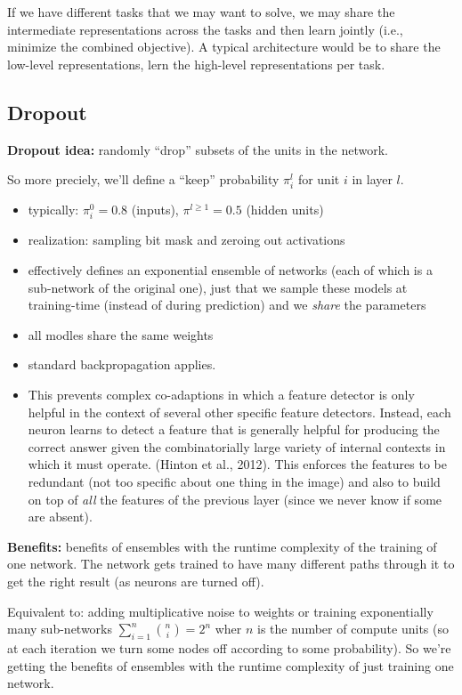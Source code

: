 \documentclass[a2paper,8pt]{extarticle}
\begin{document}
\begin{landscape}
\begin{multicols*}{7}
If we have different tasks that we may want to solve, we may share the
intermediate representations across the tasks and then learn jointly (i.e.,
minimize the combined objective). A typical architecture would be to share the
low-level representations, lern the high-level representations per task.

\subsection{Dropout}

\textbf{Dropout idea:} randomly ``drop'' subsets of the units in the network.

So more preciely, we'll define a ``keep'' probability $\pi_i^l$ for unit $i$ in
layer $l$.
\begin{itemize}
  \item typically: $\pi_i^0=0.8$ (inputs), $\pi^{l\geq 1}=0.5$ (hidden units)
  \item realization: sampling bit mask and zeroing out activations
  \item effectively defines an exponential ensemble of networks (each of which
  is a sub-network of the original one), just that we sample these models at
  training-time (instead of during prediction) and we \emph{share} the
  parameters
  \item all modles share the same weights
  \item standard backpropagation applies.
  \item This prevents complex co-adaptions in which a feature detector is only
helpful in the context of several other specific feature detectors. Instead,
each neuron learns to detect a feature that is generally helpful for producing
the correct answer given the combinatorially large variety of internal contexts
in which it must operate. (Hinton et al., 2012). This enforces the features to be redundant (not too specific about one thing in
the image) and also to build on top of \emph{all} the features of the previous
layer (since we never know if some are absent).
\end{itemize}

\textbf{Benefits:} benefits of ensembles with the runtime complexity of the
training of one network. The network gets trained to have many different paths through it to
get the right result (as neurons are turned off).

Equivalent to: adding multiplicative noise to weights or training exponentially
many sub-networks $\sum_{i=1}^{n}\binom{n}{i}=2^n$ wher $n$ is the number of
compute units (so at each iteration we turn some nodes off according to some
probability). So we're getting the benefits of ensembles with the runtime
complexity of just training one network.


\end{multicols*}
\end{landscape}
\end{document}

